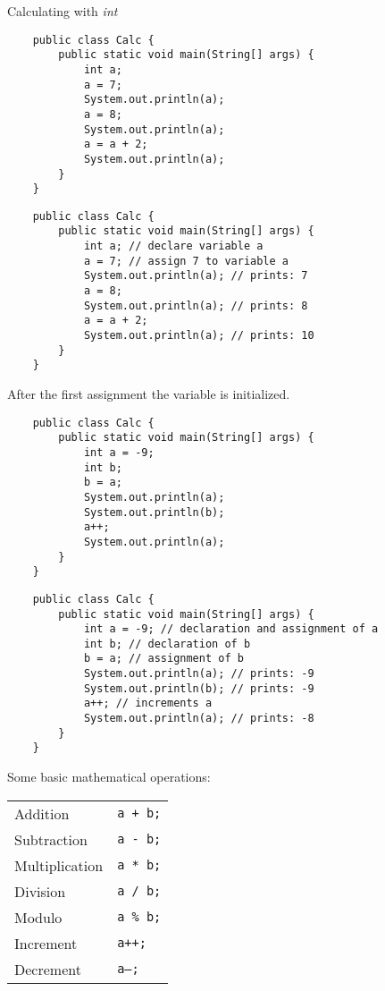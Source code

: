 \begin{frame}{Calculating with \emph{int}}
	\begin{lstlisting}
	public class Calc {
	    public static void main(String[] args) {
	        int a;
	        a = 7;
	        System.out.println(a);
	        a = 8;
	        System.out.println(a);
	        a = a + 2;
	        System.out.println(a);
	    }
	}
	\end{lstlisting}
	
\framebreak
\begin{lstlisting}
	public class Calc {
		public static void main(String[] args) {
			int a; // declare variable a
			a = 7; // assign 7 to variable a
			System.out.println(a); // prints: 7
			a = 8;
			System.out.println(a); // prints: 8
			a = a + 2;
			System.out.println(a); // prints: 10
		}
	}
\end{lstlisting}
After the first assignment the variable is initialized.
\framebreak
\begin{lstlisting}
	public class Calc {
		public static void main(String[] args) {
			int a = -9;
			int b;
			b = a;
			System.out.println(a);
			System.out.println(b); 
			a++;
			System.out.println(a); 
		}
	}
\end{lstlisting}
\framebreak
	\begin{lstlisting}
	public class Calc {
	    public static void main(String[] args) {
	        int a = -9; // declaration and assignment of a
	        int b; // declaration of b
	        b = a; // assignment of b
	        System.out.println(a); // prints: -9
	        System.out.println(b); // prints: -9
	        a++; // increments a
	        System.out.println(a); // prints: -8
	    }
	}
	\end{lstlisting}

\framebreak
	Some basic mathematical operations:
	\begin{tabular}{ll}
		Addition & \texttt{a + b;} \\
		Subtraction & \texttt{a - b;} \\
		Multiplication &\texttt{a * b;} \\
		Division & \texttt{a / b;} \\
		Modulo & \texttt{a \% b;} \\
		Increment & \texttt{a++;} \\
		Decrement & \texttt{a--;} \\
	\end{tabular}
\end{frame}

